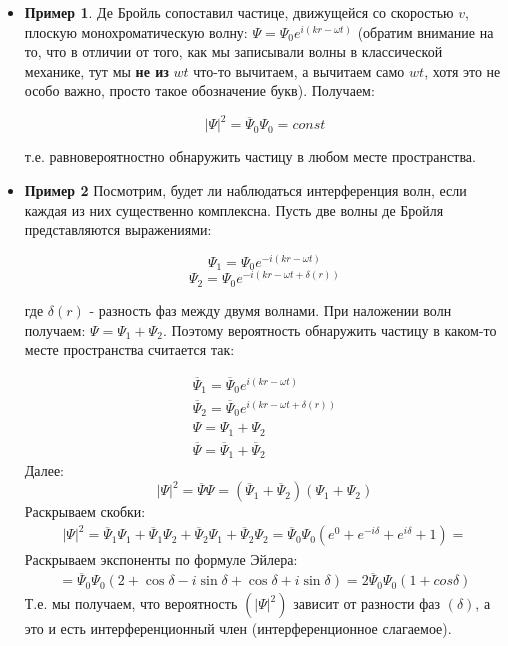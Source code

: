 \documentclass[a4paper,14pt]{article}
\begin{document}
\begin{itemize}
	\item \textbf{Пример 1}. Де Бройль сопоставил частице, движущейся со скоростью $v$, плоскую монохроматическую волну: $\Psi = \Psi_0 e^{i(kr-\omega t)}$ (обратим внимание на то, что в отличии от того, как мы записывали волны в классической механике, тут мы \textbf{не из} $wt$ что-то вычитаем, а вычитаем само $wt$, хотя это не особо важно, просто такое обозначение букв). Получаем:
	
	\[|\Psi|^2=\overline\Psi_0 \Psi_0 = const\]
	
	т.е. равновероятностно обнаружить частицу в любом месте пространства.
	
	\item \textbf{Пример 2} Посмотрим, будет ли наблюдаться интерференция волн, если каждая из них существенно комплексна. Пусть две волны де Бройля представляются выражениями:
	
	\[\Psi_1=\Psi_0 e^{-i(kr - \omega t)}\]
	\[\Psi_2=\Psi_0 e^{-i(kr - \omega t + \delta(r))}\]
	
	где $\delta(r)$ - разность фаз между двумя волнами.
	При наложении волн получаем: $\Psi = \Psi_1 + \Psi_2$.
	Поэтому вероятность обнаружить частицу в каком-то месте пространства считается так:
	
	\begin{gather*}
		\overline\Psi_1 = \overline\Psi_0 e^{i(kr-\omega t)} \\
		\overline\Psi_2=\overline\Psi_0 e^{i(kr - \omega t + \delta(r))} \\
		\Psi = \Psi_1 + \Psi_2 \\
		\overline\Psi = \overline\Psi_1 + \overline\Psi_2
	\end{gather*}
	Далее:
	\[|\Psi|^2=\overline\Psi \Psi=(\overline\Psi_1 + \overline\Psi_2)(\Psi_1 + \Psi_2)\]
	Раскрываем скобки:
	\begin{gather*}
	|\Psi|^2=\overline\Psi_1 \Psi_1 + \overline\Psi_1 \Psi_2 + \overline\Psi_2 \Psi_1 + \overline\Psi_2 \Psi_2 = \overline\Psi_0 \Psi_0 (e^0 + e^{-i\delta} + e^{i\delta} + 1) =
	\end{gather*}
	Раскрываем экспоненты по формуле Эйлера:
	\begin{gather*}
		=\overline\Psi_0 \Psi_0(2 + \cos\delta -i\sin\delta + \cos\delta + i\sin\delta) = 2\overline\Psi_0 \Psi_0(1+cos\delta) 
	\end{gather*}
	Т.е. мы получаем, что вероятность $(|\Psi|^2)$ зависит от разности фаз $(\delta)$, а это и есть интерференционный член (интерференционное слагаемое).
\end{itemize}
\end{document}
